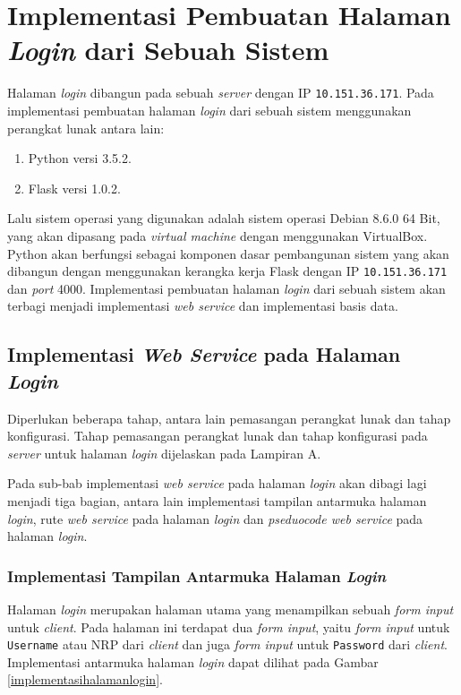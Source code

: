 \section{Implementasi Pembuatan Halaman \textit{Login} dari Sebuah Sistem}
Halaman \textit{login} dibangun pada sebuah \textit{server} dengan IP \texttt{10.151.36.171}. Pada implementasi pembuatan halaman \textit{login} dari sebuah sistem menggunakan perangkat lunak antara lain:
\begin{enumerate}
	\item Python versi 3.5.2.
	\item Flask versi 1.0.2.
\end{enumerate}

Lalu sistem operasi yang digunakan adalah sistem operasi Debian 8.6.0 64 Bit, yang akan dipasang pada \textit{virtual machine} dengan menggunakan VirtualBox. Python akan berfungsi sebagai komponen dasar pembangunan sistem yang akan dibangun dengan menggunakan kerangka kerja Flask dengan IP \texttt{10.151.36.171} dan \textit{port} 4000. Implementasi pembuatan halaman \textit{login} dari sebuah sistem akan terbagi menjadi implementasi \textit{web service} dan implementasi basis data.

\subsection{Implementasi \textit{Web Service} pada Halaman \textit{Login}}
Diperlukan beberapa tahap, antara lain pemasangan perangkat lunak dan tahap konfigurasi. Tahap pemasangan perangkat lunak dan tahap konfigurasi pada \textit{server} untuk halaman \textit{login} dijelaskan pada Lampiran A. 

Pada sub-bab implementasi \textit{web service} pada halaman \textit{login} akan dibagi lagi menjadi tiga bagian, antara lain implementasi tampilan antarmuka halaman \textit{login}, rute \textit{web service} pada halaman \textit{login} dan \textit{pseduocode web service} pada halaman \textit{login}.

\subsubsection{Implementasi Tampilan Antarmuka Halaman \textit{Login}}
Halaman \textit{login} merupakan halaman utama yang menampilkan sebuah \textit{form input} untuk \textit{client}. Pada halaman ini terdapat dua \textit{form input}, yaitu \textit{form input} untuk \texttt{Username} atau NRP dari \textit{client} dan juga \textit{form input} untuk \texttt{Password} dari \textit{client}. Implementasi antarmuka halaman \textit{login} dapat dilihat pada Gambar \ref{implementasihalamanlogin}.

